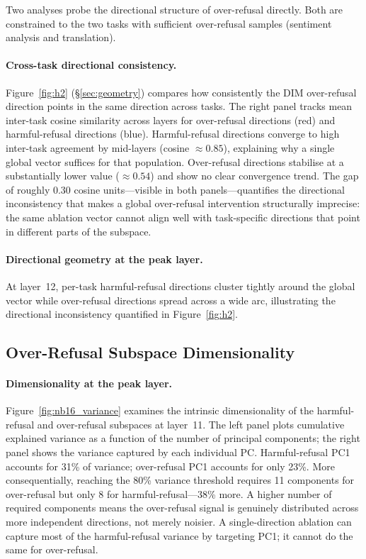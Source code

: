 \documentclass[11pt]{article}
\begin{document}
Two analyses probe the directional structure of over-refusal directly.
Both are constrained to the two tasks with sufficient over-refusal
samples (sentiment analysis and translation).

\paragraph{Cross-task directional consistency.}
Figure~\ref{fig:h2} (§\ref{sec:geometry}) compares how consistently the DIM
over-refusal direction points in the same direction across tasks.
The right panel tracks mean inter-task cosine similarity across layers for
over-refusal directions (red) and harmful-refusal directions (blue).
Harmful-refusal directions converge to high inter-task agreement by mid-layers
(cosine $\approx 0.85$), explaining why a single global vector suffices for
that population.
Over-refusal directions stabilise at a substantially lower value
($\approx 0.54$) and show no clear convergence trend.
The gap of roughly 0.30 cosine units---visible in both panels---quantifies
the directional inconsistency that makes a global over-refusal intervention
structurally imprecise: the same ablation vector cannot align well with
task-specific directions that point in different parts of the subspace.

\paragraph{Directional geometry at the peak layer.}
At layer~12, per-task harmful-refusal directions cluster tightly around the
global vector while over-refusal directions spread across a wide arc,
illustrating the directional inconsistency quantified in Figure~\ref{fig:h2}.

\subsection{Over-Refusal Subspace Dimensionality}
\label{sec:appendix_circuits}

\paragraph{Dimensionality at the peak layer.}
Figure~\ref{fig:nb16_variance} examines the intrinsic dimensionality of the
harmful-refusal and over-refusal subspaces at layer~11.
The left panel plots cumulative explained variance as a function of the
number of principal components; the right panel shows the variance captured
by each individual PC.
Harmful-refusal PC1 accounts for 31\% of variance; over-refusal PC1 accounts
for only 23\%.
More consequentially, reaching the 80\% variance threshold requires 11
components for over-refusal but only 8 for harmful-refusal---38\% more.
A higher number of required components means the over-refusal signal is
genuinely distributed across more independent directions, not merely noisier.
A single-direction ablation can capture most of the harmful-refusal variance
by targeting PC1; it cannot do the same for over-refusal.
\end{document}

